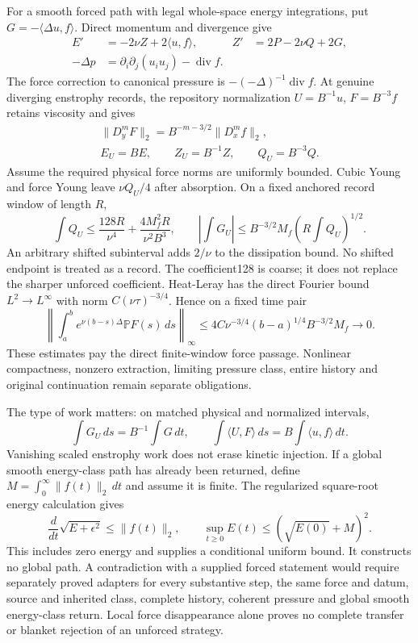 \documentclass[11pt]{article}
\begin{document}
For a smooth forced path with legal whole-space energy integrations, put
$G=-\langle\Delta u,f\rangle$. Direct momentum and divergence give
\[
 \begin{aligned}
 E'&=-2\nu Z+2\langle u,f\rangle,&
 Z'&=2P-2\nu Q+2G,\\
 -\Delta p&=\partial_i\partial_j(u_i u_j)-\operatorname{div}f.
 \end{aligned}
\]
The force correction to canonical pressure is
$-(-\Delta)^{-1}\operatorname{div}f$. At genuine diverging enstrophy
records, the repository normalization $U=B^{-1}u$, $F=B^{-3}f$ retains
viscosity and gives
\[
 \begin{gathered}
 \|D_y^m F\|_2=B^{-m-3/2}\|D_x^m f\|_2,\\
 E_U=BE,\qquad Z_U=B^{-1}Z,\qquad Q_U=B^{-3}Q.
 \end{gathered}
\]
Assume the required physical force norms are uniformly bounded. Cubic
Young and force Young leave $\nu Q_U/4$ after absorption. On a fixed
anchored record window of length $R$,
\[
 \int Q_U\le\frac{128R}{\nu^4}
       +\frac{4M_f^2R}{\nu^2B^3},\qquad
 \left|\int G_U\right|
       \le B^{-3/2}M_f\left(R\int Q_U\right)^{1/2}.
\]
An arbitrary shifted subinterval adds $2/\nu$ to the dissipation bound.
No shifted endpoint is treated as a record. The coefficient128 is coarse;
it does not replace the sharper unforced coefficient. Heat-Leray has the
direct Fourier bound $L^2\to L^\infty$ with norm
$C(\nu\tau)^{-3/4}$. Hence on a fixed time pair
\[
 \left\|\int_a^b e^{\nu(b-s)\Delta}\mathbb P F(s)\,ds\right\|_\infty
 \le4C\nu^{-3/4}(b-a)^{1/4}B^{-3/2}M_f\longrightarrow0.
\]
These estimates pay the direct finite-window force passage. Nonlinear
compactness, nonzero extraction, limiting pressure class, entire history
and original continuation remain separate obligations.

The type of work matters: on matched physical and normalized intervals,
\[
 \int G_U\,ds=B^{-1}\int G\,dt,
 \qquad \int\langle U,F\rangle\,ds=B\int\langle u,f\rangle\,dt.
\]
Vanishing scaled enstrophy work does not erase kinetic injection. If a
global smooth energy-class path has already been returned, define
$M=\int_0^\infty\|f(t)\|_2\,dt$ and assume it is finite. The regularized
square-root energy calculation gives
\[
 \frac{d}{dt}\sqrt{E+\epsilon^2}\le\|f(t)\|_2,
 \qquad \sup_{t\ge0}E(t)\le(\sqrt{E(0)}+M)^2.
\]
This includes zero energy and supplies a conditional uniform bound.
It constructs no global path. A contradiction with a supplied forced
statement would require separately proved adapters for every substantive
step, the same force and datum, source and inherited class, complete
history, coherent pressure and global smooth energy-class return.
Local force disappearance alone proves no complete transfer or blanket
rejection of an unforced strategy.
\end{document}
